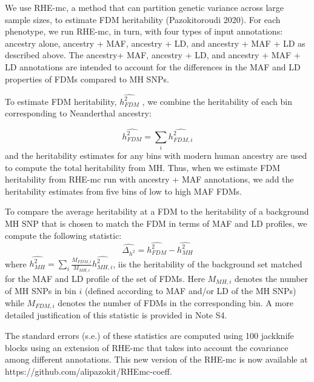 We use RHE-mc, a method that can partition genetic variance across large sample sizes, to estimate FDM heritability (Pazokitoroudi 2020). For each phenotype, we run RHE-mc, in turn, with four types of input annotations: ancestry alone, ancestry + MAF, ancestry + LD, and ancestry + MAF + LD as described above. The ancestry+ MAF, ancestry + LD, and ancestry + MAF + LD annotations are intended to account for the differences in the MAF and LD properties of FDMs compared to MH SNPs.

To estimate FDM heritability, $\hat{h^2_{FDM}}$ , we combine the heritability of each bin corresponding to Neanderthal ancestry:

$$\hat{h^2_{FDM}} = \sum_i \hat{h^2_{FDM,i}}$$
and the heritability estimates for any bins with modern human ancestry are used to compute the total heritability from MH. Thus, when we estimate FDM heritability from RHE-mc run with ancestry + MAF annotations, we add the heritability estimates from five bins of low to high MAF FDMs.
 
To compare the average heritability at a FDM to the heritability of a background MH SNP that is chosen to match the FDM in terms of MAF and LD profiles, we compute the following statistic:
$$\hat{\Delta_{h^2}}=\hat{h^2_{FDM}}-\hat{h^2_{MH}}$$
where $\hat{h^2_{MH}} = \sum_i \frac{M_{FDM,i}}{M_{MH,i}} \hat{h^2_{MH,i}}$, iis the heritability of the background set matched for the MAF and LD profile of the set of FDMs. Here $M_{MH,i}$ denotes the number of MH SNPs in bin $i$  (defined according to MAF and/or LD of the MH SNPs) while $M_{FDM,i}$ denotes the number of FDMs in the corresponding bin. A more detailed justification of this statistic is provided in Note S4.

The standard errors (s.e.) of these statistics are computed using 100 jackknife blocks using an extension of RHE-mc that takes into account the covariance among different annotations. This new version of the RHE-mc is now available at https://github.com/alipazokit/RHEmc-coeff.
\newpage
\FloatBarrier
